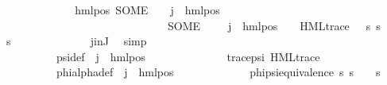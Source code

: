 \begin{isabellebody}
\ \ \ \ \ \ \ \ \isamarkupfalse%
\ \isamarkupfalse%
\ {\isachardoublequoteopen}{\isachardot}{\kern0pt}{\isachardot}{\kern0pt}{\isachardot}{\kern0pt}\ {\isacharequal}{\kern0pt}\ {\isacharparenleft}{\kern0pt}hml{\isacharunderscore}{\kern0pt}pos\ {\isacharparenleft}{\kern0pt}SOME\ {\isasymalpha}{\isachardot}{\kern0pt}\ {\isasymexists}{\isasymphi}{\isachardot}{\kern0pt}\ {\isasymPhi}\ j\ {\isacharequal}{\kern0pt}\ hml{\isacharunderscore}{\kern0pt}pos\ {\isasymalpha}\ {\isasymphi}{\isacharparenright}{\kern0pt}\ \isanewline
\ \ \ \ \ \ \ \ \ \ \ \ \ \ \ \ \ \ \ \ \ \ \ \ \ \ \ \ \ \ {\isacharparenleft}{\kern0pt}SOME\ {\isasympsi}{\isachardot}{\kern0pt}\ {\isasymexists}{\isasymalpha}\ {\isasymphi}{\isachardot}{\kern0pt}\ {\isasymPhi}\ j\ {\isacharequal}{\kern0pt}\ hml{\isacharunderscore}{\kern0pt}pos\ {\isasymalpha}\ {\isasymphi}\ {\isasymand}\ HML{\isacharunderscore}{\kern0pt}trace\ {\isasympsi}\ {\isasymand}\ {\isacharparenleft}{\kern0pt}{\isasymforall}s{\isachardot}{\kern0pt}\ s\ {\isasymTurnstile}\ {\isasymphi}\ {\isasymlongleftrightarrow}\ s\ {\isasymTurnstile}\ {\isasympsi}{\isacharparenright}{\kern0pt}{\isacharparenright}{\kern0pt}{\isacharparenright}{\kern0pt}{\isachardoublequoteclose}\isanewline
\ \ \ \ \ \ \ \ \ \ \isamarkupfalse%
\ j{\isacharunderscore}{\kern0pt}in{\isacharunderscore}{\kern0pt}J\ \isamarkupfalse%
\ simp\isanewline
\ \ \ \ \ \ \ \ \isamarkupfalse%
\ \isamarkupfalse%
\ {\isasymalpha}\ {\isasymphi}\ {\isasympsi}\ \ \isanewline
\ \ \ \ \ \ \ \ \ \ psi{\isacharunderscore}{\kern0pt}def{\isacharcolon}{\kern0pt}\ {\isachardoublequoteopen}{\isasymPsi}\ j\ {\isacharequal}{\kern0pt}\ hml{\isacharunderscore}{\kern0pt}pos\ {\isasymalpha}\ {\isasympsi}{\isachardoublequoteclose}\ \ \isanewline
\ \ \ \ \ \ \ \ \ \ trace{\isacharunderscore}{\kern0pt}psi{\isacharcolon}{\kern0pt}\ {\isachardoublequoteopen}HML{\isacharunderscore}{\kern0pt}trace\ {\isasympsi}{\isachardoublequoteclose}\ \ \isanewline
\ \ \ \ \ \ \ \ \ \ phi{\isacharunderscore}{\kern0pt}alpha{\isacharunderscore}{\kern0pt}def{\isacharcolon}{\kern0pt}\ {\isachardoublequoteopen}{\isasymPhi}\ j\ {\isacharequal}{\kern0pt}\ hml{\isacharunderscore}{\kern0pt}pos\ {\isasymalpha}\ {\isasymphi}{\isachardoublequoteclose}\ \isanewline
\ \ \ \ \ \ \ \ \ \ phi{\isacharunderscore}{\kern0pt}psi{\isacharunderscore}{\kern0pt}equivalence{\isacharcolon}{\kern0pt}\ {\isachardoublequoteopen}{\isasymforall}s{\isachardot}{\kern0pt}\ s\ {\isasymTurnstile}\ {\isasymphi}\ {\isasymlongleftrightarrow}\ s\ {\isasymTurnstile}\ {\isasympsi}{\isachardoublequoteclose}\ \isanewline

\end{isabellebody}
